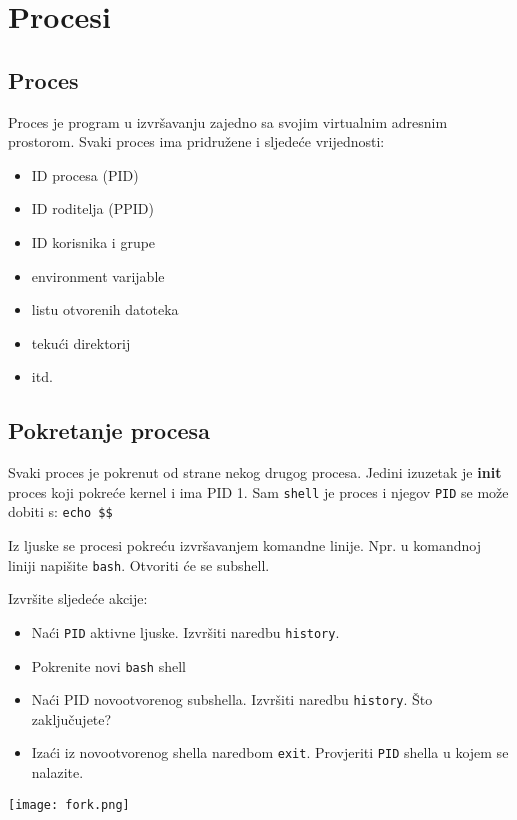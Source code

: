 \section{Procesi}
\subsection*{Proces}
Proces je program u izvršavanju zajedno sa svojim virtualnim adresnim prostorom. Svaki proces ima pridružene i sljedeće vrijednosti:
\begin{itemize}
 \item ID procesa (PID)
 \item ID roditelja (PPID)
 \item ID korisnika i grupe
 \item environment varijable
 \item listu otvorenih datoteka
 \item tekući direktorij
 \item itd.
\end{itemize}
\subsection*{Pokretanje procesa}
Svaki proces je pokrenut od strane nekog drugog procesa. Jedini izuzetak je \textbf{init} proces koji pokreće kernel i ima PID 1. Sam \texttt{shell} je proces i njegov \texttt{PID} se može dobiti s: \texttt{echo \$\$}

Iz ljuske se procesi pokreću izvršavanjem komandne linije. Npr. u komandnoj liniji napišite \texttt{bash}. Otvoriti će se subshell. 

\begin{zadatak} Izvršite sljedeće akcije:
\begin{itemize} 
 \item Naći \texttt{PID} aktivne ljuske. Izvršiti naredbu \texttt{history}.
 \item Pokrenite novi \texttt{bash} shell
 \item Naći PID novootvorenog subshella. Izvršiti naredbu \texttt{history}. Što zaključujete?
 \item Izaći iz novootvorenog shella naredbom \texttt{exit}. Provjeriti \texttt{PID} shella u kojem se nalazite. 
\end{itemize}
  
\end{zadatak}
\begin{center} 
\texttt{[image: fork.png]}%
\end{center}


